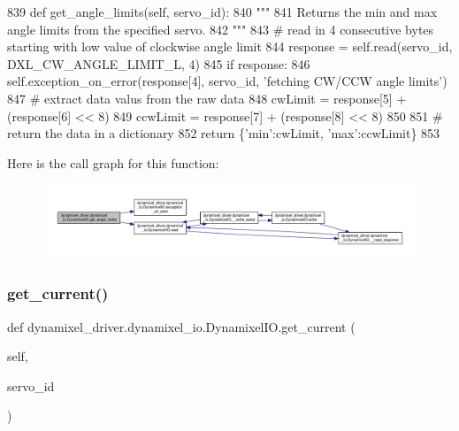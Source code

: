 \begin{DoxyCode}
839     \textcolor{keyword}{def }get\_angle\_limits(self, servo\_id):
840         \textcolor{stringliteral}{"""}
841 \textcolor{stringliteral}{        Returns the min and max angle limits from the specified servo.}
842 \textcolor{stringliteral}{        """}
843         \textcolor{comment}{# read in 4 consecutive bytes starting with low value of clockwise angle limit}
844         response = self.read(servo\_id, DXL\_CW\_ANGLE\_LIMIT\_L, 4)
845         \textcolor{keywordflow}{if} response:
846             self.exception\_on\_error(response[4], servo\_id, \textcolor{stringliteral}{'fetching CW/CCW angle limits'})
847         \textcolor{comment}{# extract data valus from the raw data}
848         cwLimit = response[5] + (response[6] << 8)
849         ccwLimit = response[7] + (response[8] << 8)
850 
851         \textcolor{comment}{# return the data in a dictionary}
852         \textcolor{keywordflow}{return} \{\textcolor{stringliteral}{'min'}:cwLimit, \textcolor{stringliteral}{'max'}:ccwLimit\}
853 
\end{DoxyCode}
Here is the call graph for this function\+:
\nopagebreak
\begin{figure}[H]
\begin{center}
\leavevmode
\includegraphics[width=350pt]{dd/d77/classdynamixel__driver_1_1dynamixel__io_1_1_dynamixel_i_o_af3a593697df035e17e287e3d401a8fe7_cgraph}
\end{center}
\end{figure}
\mbox{\label{classdynamixel__driver_1_1dynamixel__io_1_1_dynamixel_i_o_aac11f861a1d7b67bb5976a43ea69b092}} 
\subsubsection{\texorpdfstring{get\+\_\+current()}{get\_current()}}
{\footnotesize\ttfamily def dynamixel\+\_\+driver.\+dynamixel\+\_\+io.\+Dynamixel\+I\+O.\+get\+\_\+current (\begin{DoxyParamCaption}\item[{}]{self,  }\item[{}]{servo\+\_\+id }\end{DoxyParamCaption})}

